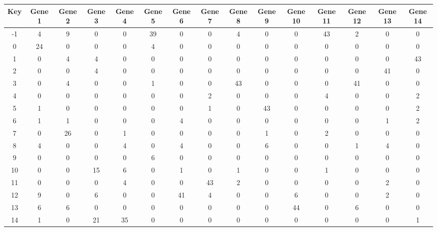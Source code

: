 \begin{tabular}{|c|c|c|c|c|c|c|c|c|c|c|c|c|c|c|}
\hline
Key & Gene 1 & Gene 2 & Gene 3 & Gene 4 & Gene 5 & Gene 6 & Gene 7 & Gene 8 & Gene 9 & Gene 10 & Gene 11 & Gene 12 & Gene 13 & Gene 14 \\
\hline
-1 & 4 & 9 & 0 & 0 & 39 & 0 & 0 & 4 & 0 & 0 & 43 & 2 & 0 & 0 \\
0 & 24 & 0 & 0 & 0 & 4 & 0 & 0 & 0 & 0 & 0 & 0 & 0 & 0 & 0 \\
1 & 0 & 4 & 4 & 0 & 0 & 0 & 0 & 0 & 0 & 0 & 0 & 0 & 0 & 43 \\
2 & 0 & 0 & 4 & 0 & 0 & 0 & 0 & 0 & 0 & 0 & 0 & 0 & 41 & 0 \\
3 & 0 & 4 & 0 & 0 & 1 & 0 & 0 & 43 & 0 & 0 & 0 & 41 & 0 & 0 \\
4 & 0 & 0 & 0 & 0 & 0 & 0 & 2 & 0 & 0 & 0 & 4 & 0 & 0 & 2 \\
5 & 1 & 0 & 0 & 0 & 0 & 0 & 1 & 0 & 43 & 0 & 0 & 0 & 0 & 2 \\
6 & 1 & 1 & 0 & 0 & 0 & 4 & 0 & 0 & 0 & 0 & 0 & 0 & 1 & 2 \\
7 & 0 & 26 & 0 & 1 & 0 & 0 & 0 & 0 & 1 & 0 & 2 & 0 & 0 & 0 \\
8 & 4 & 0 & 0 & 4 & 0 & 4 & 0 & 0 & 6 & 0 & 0 & 1 & 4 & 0 \\
9 & 0 & 0 & 0 & 0 & 6 & 0 & 0 & 0 & 0 & 0 & 0 & 0 & 0 & 0 \\
10 & 0 & 0 & 15 & 6 & 0 & 1 & 0 & 1 & 0 & 0 & 1 & 0 & 0 & 0 \\
11 & 0 & 0 & 0 & 4 & 0 & 0 & 43 & 2 & 0 & 0 & 0 & 0 & 2 & 0 \\
12 & 9 & 0 & 6 & 0 & 0 & 41 & 4 & 0 & 0 & 6 & 0 & 0 & 2 & 0 \\
13 & 6 & 6 & 0 & 0 & 0 & 0 & 0 & 0 & 0 & 44 & 0 & 6 & 0 & 0 \\
14 & 1 & 0 & 21 & 35 & 0 & 0 & 0 & 0 & 0 & 0 & 0 & 0 & 0 & 1 \\
\hline
\end{tabular}